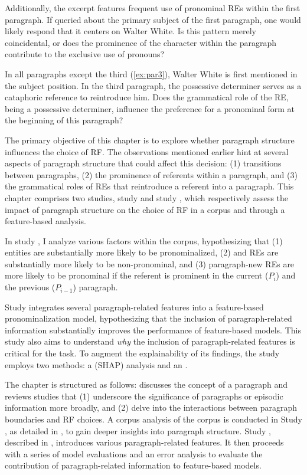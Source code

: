 Additionally, the excerpt features frequent use of pronominal REs within the first paragraph. If queried about the primary subject of the first paragraph, one would likely respond that it centers on Walter White. Is this pattern merely coincidental, or does the prominence of the character within the paragraph contribute to the exclusive use of pronouns?

In all paragraphs except the third (\ref{ex:par3}), Walter White is first mentioned in the subject position. In the third paragraph, the possessive determiner  serves as a cataphoric reference to reintroduce him. Does the grammatical role of the RE, being a possessive determiner, influence the preference for a pronominal form at the beginning of this paragraph?

The primary objective of this chapter is to explore whether paragraph structure influences the choice of RF. The observations mentioned earlier hint at several aspects of paragraph structure that could affect this decision: (1) transitions between paragraphs, (2) the prominence of referents within a paragraph, and (3) the grammatical roles of REs that reintroduce a referent into a paragraph. This chapter comprises two studies, study \studD and study \studE, which respectively assess the impact of paragraph structure on the choice of RF in a corpus and through a feature-based \context analysis.

In study \studD, I analyze various factors within the \wsj corpus, hypothesizing that (1)  entities are substantially more likely to be pronominalized, (2)  and  REs are substantially more likely to be non-pronominal, and (3) paragraph-new REs are more likely to be pronominal if the referent is prominent in the current ($P_{i}$) and the previous ($P_{i-1}$) paragraph.

Study \studE integrates several paragraph-related features into a feature-based pronominalization model, hypothesizing that the inclusion of paragraph-related information substantially improves the performance of feature-based \context models. This study also aims to understand \textit{why} the inclusion of paragraph-related features is critical for the task. To augment the explainability of its findings, the study employs two methods: a  (SHAP) analysis and an .


The chapter is structured as follows:
 discusses the concept of a paragraph and reviews studies that (1) underscore the significance of paragraphs or episodic information more broadly, and (2) delve into the interactions between paragraph boundaries and RF choices.
A corpus analysis of the \wsj corpus is conducted in Study \studD, as detailed in , to gain deeper insights into paragraph structure. Study \studE, described in , introduces various paragraph-related features. It then proceeds with a series of \context model evaluations and an error analysis to evaluate the contribution of paragraph-related information to feature-based \context models.

